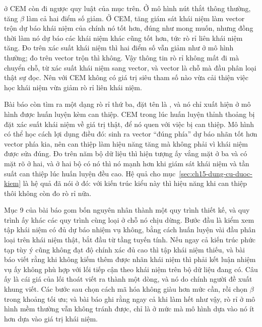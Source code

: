 %
 ở CEM còn đi ngược quy luật của mục trên. Ở mô hình nút thắt
thông thường, tăng $\beta$ làm cả hai điểm số giảm. Ở CEM, tăng giám sát khái
niệm làm vector trộn dự báo khái niệm của chính nó tốt hơn, đúng như mong muốn,
nhưng đồng thời làm nó dự báo các khái niệm khác cũng tốt hơn, tức rò rỉ liên
khái niệm tăng. Đo trên xác suất khái niệm thì hai điểm số vẫn giảm như ở mô hình
thường; đo trên vector trộn thì không. Vậy thông tin rò rỉ
không mất đi mà chuyển chỗ, từ xác suất khái niệm sang vector, và vector là chỗ
mà đầu phân loại thật sự đọc. Nên với CEM không có giá trị siêu tham số nào vừa
cải thiện việc học khái niệm vừa giảm rò rỉ liên khái niệm.

%
Bài báo còn tìm ra một dạng rò rỉ thứ ba, đặt tên là
, và nó chỉ
xuất hiện ở mô hình được huấn luyện kèm can thiệp. CEM trong lúc huấn luyện thỉnh
thoảng bị đặt xác suất khái niệm về giá trị thật, để nó quen với việc bị can
thiệp. Mô hình có thể học cách lợi dụng điều đó: sinh ra vector \enquote{đúng
phía} dự báo nhãn tốt hơn vector phía kia, nên can thiệp làm hiệu năng tăng mà
không phải vì khái niệm được sửa đúng. Đo trên năm bộ dữ liệu thì hiện tượng ấy
vắng mặt ở ba và có mặt rõ ở hai, và ở hai bộ có nó thì nó mạnh hơn khi giám sát
khái niệm và tần suất can thiệp lúc huấn luyện đều cao. Hệ quả cho mục~\ref{sec:ch15-dung-cu-duoc-kiem}
là hệ quả đã nói ở đó: với kiến trúc kiểu này thì hiệu năng khi can thiệp thôi
không còn đo rò rỉ nữa.

%
%
Mục 9 của bài báo gom bốn nguyên nhân thành một quy trình thiết kế, và quy
trình ấy khác các quy trình cùng loại ở chỗ nó chịu dừng. Bước đầu là kiểm xem tập khái
niệm có đủ dự báo nhiệm vụ không, bằng cách huấn luyện vài đầu phân loại trên
khái niệm thật, bắt đầu từ tầng tuyến tính. Nếu ngay cả kiến trúc phức tạp tùy ý
cũng không đạt độ chính xác đủ cao thì tập khái niệm thiếu, và bài báo viết rằng
khi không kiếm thêm được nhãn khái niệm thì phải kết luận nhiệm vụ ấy không phù
hợp với lối tiếp cận theo khái niệm trên bộ dữ liệu đang có. Câu ấy là cái giá
của lối thoát viết ra thành một dòng, và nó do chính người đề xuất khung viết.
Các bước sau chọn cách mã hóa không giàu hơn mức cần, rồi chọn $\beta$ trong
khoảng tối ưu; và bài báo ghi rằng ngay cả khi làm hết như vậy, rò rỉ ở mô hình
mềm thường vẫn không tránh được, chỉ là ở mức mà mô hình dựa vào nó ít hơn dựa
vào giá trị khái niệm.
